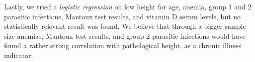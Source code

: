

Lastly, we tried a \textit{logistic regression} on low height for age, anemia, group 1 and 2 parasitic infections, Mantoux test results, and vitamin D serum levels, but no statistically relevant result was found. We believe that through a bigger sample size anemias, Mantoux test results, and group 2 parasitic infections would have found a rather strong correlation with pathological height, as a chronic illness indicator.
